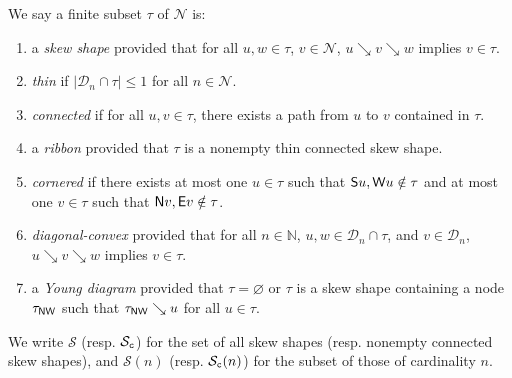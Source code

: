 \documentclass[Unicode,ALCO]{cedram}
\newcommand{\N}{\mathcal{N}}
\newcommand{\SSSS}{\mathcal{S}}
\newcommand{\0}{{\bar 0}}
\newcommand{\NN}{{\mathbb N}}
\newcommand{\D}{{\mathcal D}}
\newcommand{\so}{{\sf S}}
\newcommand{\no}{{\sf N}}
\newcommand{\ea}{{\sf E}}
\newcommand{\we}{{\sf W}}
\newcommand{\nnww}{{\sf NW}}
\begin{document}
\begin{defi}\label{skewdef}
We say a finite subset \(\tau\) of \(\N\) is:
\begin{enumerate}
\item a {\em skew shape} provided that for all \(u,w \in \tau\), \(v \in \N\), \(u \searrow v \searrow w\) implies \(v \in \tau\).
\item {\em thin} if \(|\D_n \cap \tau| \leq 1\) for all \(n \in \N\).
\item {\em connected} if for all \(u,v \in \tau\), there exists a path from \(u\) to \(v\) contained in \(\tau\).
\item a {\em ribbon} provided that \(\tau\) is a nonempty thin connected skew shape.
\item {\em cornered} if there exists at most one \(u \in \tau\) such that \(\so u, \we u \notin \tau\) and at most one \(v \in \tau\) such that \(\no v, \ea v \notin \tau\).
\item {\em diagonal-convex} provided that for all \(n \in \NN\), \(u,w \in \D_n \cap \tau\), and \(v \in \D_n\), \(u \searrow v \searrow w\) implies \(v \in \tau\).
\item a {\em Young diagram} provided that \(\tau = \varnothing\) or \(\tau\) is a skew shape containing a node \(\tau_{\nnww}\) such that \(\tau_{\nnww} \searrow u\) for all \(u \in \tau\).
\end{enumerate}
We write \(\SSSS\) (resp. \(\SSSS_{\tt c}\)) for the set of all skew shapes (resp. nonempty connected skew shapes), and \(\SSSS(n)\) (resp. \(\SSSS_{\tt c}(n)\)) for the subset of those of cardinality \(n\).
\end{defi}
\end{document}
